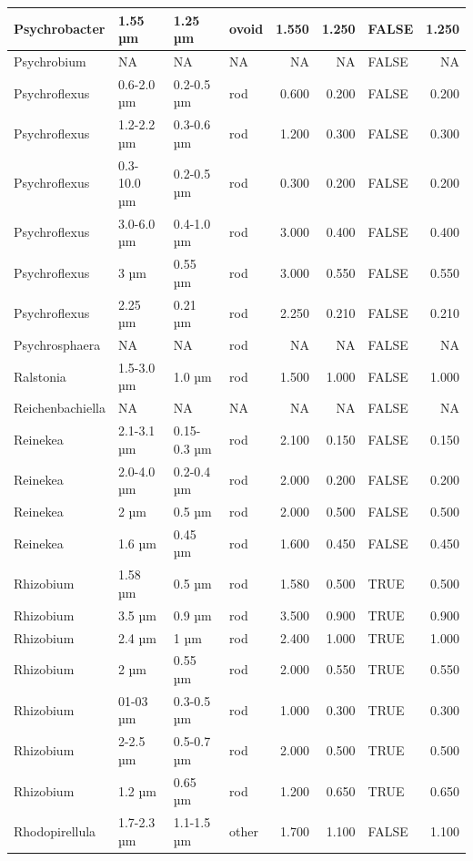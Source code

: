 \documentclass[
]{article}
\begin{document}
\begin{table}
\begin{tabular}{l|l|l|l|r|r|l|r}
\hline
Psychrobacter & 1.55 µm & 1.25 µm & ovoid & 1.550 & 1.250 & FALSE & 1.250\\
\hline
Psychrobium & NA & NA & NA & NA & NA & FALSE & NA\\
\hline
Psychroflexus & 0.6-2.0 µm & 0.2-0.5 µm & rod & 0.600 & 0.200 & FALSE & 0.200\\
\hline
Psychroflexus & 1.2-2.2 µm & 0.3-0.6 µm & rod & 1.200 & 0.300 & FALSE & 0.300\\
\hline
Psychroflexus & 0.3-10.0 µm & 0.2-0.5 µm & rod & 0.300 & 0.200 & FALSE & 0.200\\
\hline
Psychroflexus & 3.0-6.0 µm & 0.4-1.0 µm & rod & 3.000 & 0.400 & FALSE & 0.400\\
\hline
Psychroflexus & 3 µm & 0.55 µm & rod & 3.000 & 0.550 & FALSE & 0.550\\
\hline
Psychroflexus & 2.25 µm & 0.21 µm & rod & 2.250 & 0.210 & FALSE & 0.210\\
\hline
Psychrosphaera & NA & NA & rod & NA & NA & FALSE & NA\\
\hline
Ralstonia & 1.5-3.0 µm & 1.0 µm & rod & 1.500 & 1.000 & FALSE & 1.000\\
\hline
Reichenbachiella & NA & NA & NA & NA & NA & FALSE & NA\\
\hline
Reinekea & 2.1-3.1 µm & 0.15-0.3 µm & rod & 2.100 & 0.150 & FALSE & 0.150\\
\hline
Reinekea & 2.0-4.0 µm & 0.2-0.4 µm & rod & 2.000 & 0.200 & FALSE & 0.200\\
\hline
Reinekea & 2 µm & 0.5 µm & rod & 2.000 & 0.500 & FALSE & 0.500\\
\hline
Reinekea & 1.6 µm & 0.45 µm & rod & 1.600 & 0.450 & FALSE & 0.450\\
\hline
Rhizobium & 1.58 µm & 0.5 µm & rod & 1.580 & 0.500 & TRUE & 0.500\\
\hline
Rhizobium & 3.5 µm & 0.9 µm & rod & 3.500 & 0.900 & TRUE & 0.900\\
\hline
Rhizobium & 2.4 µm & 1 µm & rod & 2.400 & 1.000 & TRUE & 1.000\\
\hline
Rhizobium & 2 µm & 0.55 µm & rod & 2.000 & 0.550 & TRUE & 0.550\\
\hline
Rhizobium & 01-03 µm & 0.3-0.5 µm & rod & 1.000 & 0.300 & TRUE & 0.300\\
\hline
Rhizobium & 2-2.5 µm & 0.5-0.7 µm & rod & 2.000 & 0.500 & TRUE & 0.500\\
\hline
Rhizobium & 1.2 µm & 0.65 µm & rod & 1.200 & 0.650 & TRUE & 0.650\\
\hline
Rhodopirellula & 1.7-2.3 µm & 1.1-1.5 µm & other & 1.700 & 1.100 & FALSE & 1.100\\

\end{tabular}
\end{table}
\end{document}
